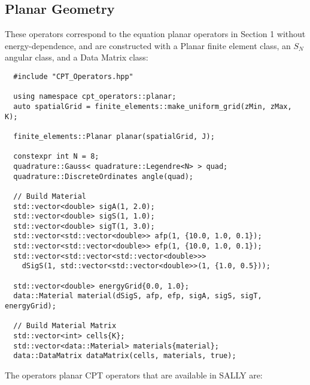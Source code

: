 \documentclass[../main.tex]{subfiles}
\begin{document}
\subsection{Planar Geometry}
These operators correspond to the equation planar operators in Section 1 without energy-dependence, and are constructed with a Planar finite element class, an $S_N$ angular class, and a Data Matrix class:
\begin{lstlisting}
  #include "CPT_Operators.hpp"
  
  using namespace cpt_operators::planar;
  auto spatialGrid = finite_elements::make_uniform_grid(zMin, zMax, K);

  finite_elements::Planar planar(spatialGrid, J);

  constexpr int N = 8;
  quadrature::Gauss< quadrature::Legendre<N> > quad;
  quadrature::DiscreteOrdinates angle(quad);

  // Build Material
  std::vector<double> sigA(1, 2.0);
  std::vector<double> sigS(1, 1.0);
  std::vector<double> sigT(1, 3.0);
  std::vector<std::vector<double>> afp(1, {10.0, 1.0, 0.1});
  std::vector<std::vector<double>> efp(1, {10.0, 1.0, 0.1});
  std::vector<std::vector<std::vector<double>>> 
    dSigS(1, std::vector<std::vector<double>>(1, {1.0, 0.5}));

  std::vector<double> energyGrid{0.0, 1.0};
  data::Material material(dSigS, afp, efp, sigA, sigS, sigT, energyGrid);

  // Build Material Matrix
  std::vector<int> cells{K};
  std::vector<data::Material> materials{material};
  data::DataMatrix dataMatrix(cells, materials, true);
\end{lstlisting}
The operators planar CPT operators that are available in SALLY are:
\end{document}

